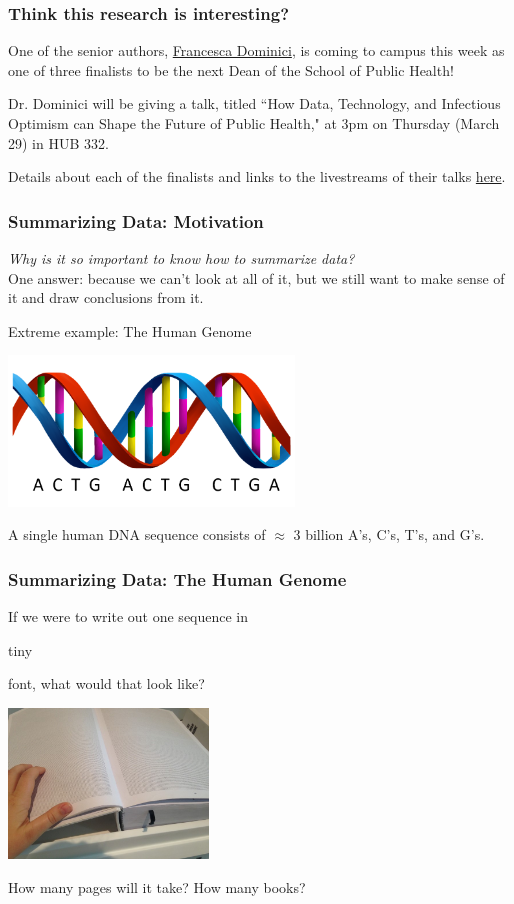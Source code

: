 \documentclass[12pt, 
hyperref={colorlinks=true, linkcolor=blue, urlcolor=cyan}]{beamer}
\begin{document}
\begin{frame}
\frametitle{Think this research is interesting?}

One of the senior authors, \href{https://sites.sph.harvard.edu/francesca-dominici/}{Francesca Dominici}, is coming to campus this week as one of three finalists to be the next Dean of the School of Public Health!

Dr. Dominici will be giving a talk, titled ``How Data, Technology, and Infectious Optimism can Shape the Future of Public Health," at 3pm on Thursday (March 29) in HUB 332.

Details about each of the finalists and links to the livestreams of their talks \href{http://www.washington.edu/provost/leadership-searches/deanship-of-the-school-of-public-health/}{here}.
\end{frame}

\begin{frame} 
\frametitle{Summarizing Data: Motivation}
\textit{Why is it so important to know how to summarize data?} \\ One answer: because we can't look at all of it, but we still want to make sense of it and draw conclusions from it.

\color{blue} Extreme example: \color{black} The Human Genome
\vspace{-0.4cm} \begin{center} \includegraphics[height=4cm]{./dna} \end{center}
\vspace{-0.8cm} \begin{scriptsize} A single human DNA sequence consists of $\approx$ 3 billion A's, C's, T's, and G's. \end{scriptsize}
\end{frame}

\begin{frame}
\frametitle{Summarizing Data: The Human Genome}
If we were to write out one sequence in \begin{tiny} tiny \end{tiny} font, what would that look like? 

\center \includegraphics[height=4cm]{./book}

How many pages will it take? How many books?
\end{frame}
\end{document}
